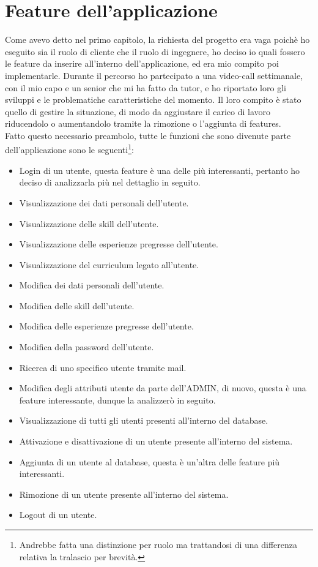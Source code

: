 \section{Feature dell'applicazione}
Come avevo detto nel primo capitolo, la richiesta del progetto era vaga poichè ho eseguito sia il ruolo di cliente che il ruolo di ingegnere, ho deciso io quali fossero le feature da inserire all'interno dell'applicazione, ed era mio compito poi implementarle. Durante il percorso ho partecipato a una video-call settimanale, con il mio capo e un senior che mi ha fatto da tutor, e ho riportato loro gli sviluppi e le problematiche caratteristiche del momento. Il loro compito è stato quello di gestire la situazione, di modo da aggiustare il carico di lavoro riducendolo o aumentandolo tramite la rimozione o l'aggiunta di features.
\\
Fatto questo necessario preambolo, tutte le funzioni che sono divenute parte dell'applicazione sono le seguenti\footnote{
Andrebbe fatta una distinzione per ruolo ma trattandosi di una differenza relativa la tralascio per brevità.
}:
\begin{itemize}
    \item Login di un utente, questa feature è una delle più interessanti, pertanto ho deciso di analizzarla più nel dettaglio in seguito.
    \item Visualizzazione dei dati personali dell'utente.
    \item Visualizzazione delle skill dell'utente.
    \item Visualizzazione delle esperienze pregresse dell'utente.
    \item Visualizzazione del curriculum legato all'utente.
    \item Modifica dei dati personali dell'utente.
    \item Modifica delle skill dell'utente.
    \item Modifica delle esperienze pregresse dell'utente.
    \item Modifica della password dell'utente.
    \item Ricerca di uno specifico utente tramite mail.
    \item Modifica degli attributi utente da parte dell'ADMIN, di nuovo, questa è una feature interessante, dunque la analizzerò in seguito.
    \item Visualizzazione di tutti gli utenti presenti all'interno del database.
    \item Attivazione e disattivazione di un utente presente all'interno del sistema.
    \item Aggiunta di un utente al database, questa è un'altra delle feature più interessanti.
    \item Rimozione di un utente presente all'interno del sistema.
    \item Logout di un utente.
\end{itemize}



